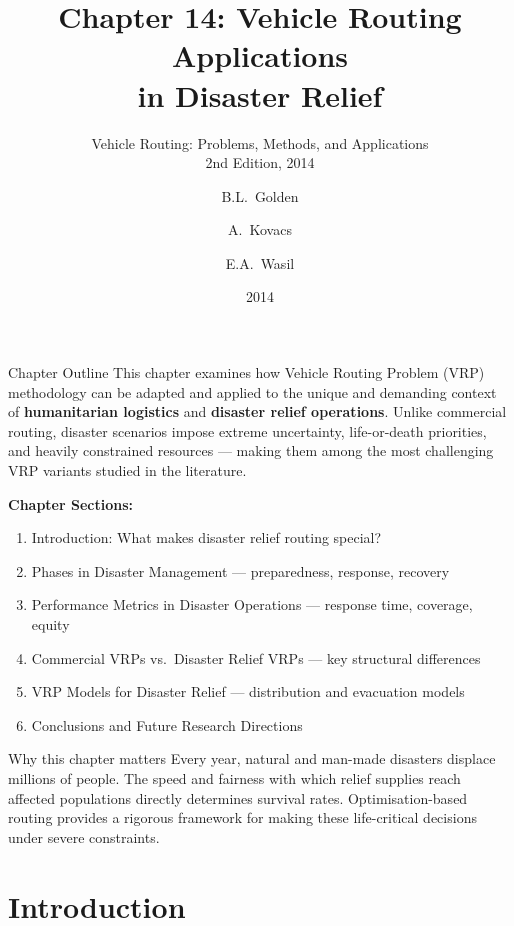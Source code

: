 \documentclass[aspectratio=169,10pt]{beamer}
\title[Ch.14: Disaster Relief VRP]
      {Chapter 14: Vehicle Routing Applications\\in Disaster Relief}
\subtitle{Vehicle Routing: Problems, Methods, and Applications\\
          2nd Edition, 2014}
\author{B.L.\ Golden \and A.\ Kovacs \and E.A.\ Wasil}
\institute{Lecture Notes --- Self-Contained Reader Edition}
\date{2014}
\begin{document}

\begin{frame}
  \titlepage
\end{frame}

\begin{frame}[allowframebreaks]{Chapter Outline}
  This chapter examines how Vehicle Routing Problem (VRP) methodology can
  be adapted and applied to the unique and demanding context of
  \textbf{humanitarian logistics} and \textbf{disaster relief operations}.
  Unlike commercial routing, disaster scenarios impose extreme uncertainty,
  life-or-death priorities, and heavily constrained resources --- making
  them among the most challenging VRP variants studied in the literature.

  \medskip
  \textbf{Chapter Sections:}
  \begin{enumerate}
    \item Introduction: What makes disaster relief routing special?
    \item Phases in Disaster Management --- preparedness, response, recovery
    \item Performance Metrics in Disaster Operations --- response time, coverage, equity
    \item Commercial VRPs vs.\ Disaster Relief VRPs --- key structural differences
    \item VRP Models for Disaster Relief --- distribution and evacuation models
    \item Conclusions and Future Research Directions
  \end{enumerate}

  \medskip
  \begin{alertblock}{Why this chapter matters}
    Every year, natural and man-made disasters displace millions of people.
    The speed and fairness with which relief supplies reach affected
    populations directly determines survival rates.
    Optimisation-based routing provides a rigorous framework for making
    these life-critical decisions under severe constraints.
  \end{alertblock}
\end{frame}

\section{Introduction}
\end{document}
